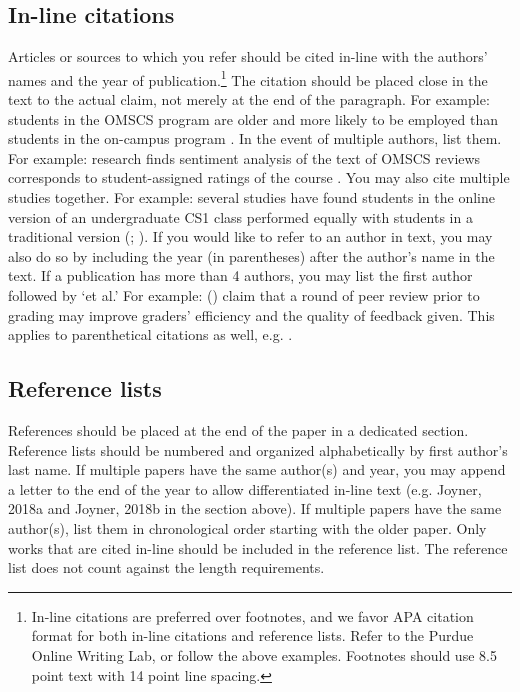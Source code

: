\documentclass[
	letterpaper, %
]{jdf}
\begin{document}
\subsection{In-line citations}
Articles or sources to which you refer should be cited in-line with the authors’ names and the year of publication.\footnote{In-line citations are preferred over footnotes, and we favor APA citation format for both in-line citations and reference lists. Refer to the Purdue Online Writing Lab, or follow the above examples. Footnotes should use 8.5 point text with 14 point line spacing.} The citation should be placed close in the text to the actual claim, not merely at the end of the paragraph. For example: students in the OMSCS program are older and more likely to be employed than students in the on-campus program \citep{joyner2017}. In the event of multiple authors, list them. For example: research finds sentiment analysis of the text of OMSCS reviews corresponds to student-assigned ratings of the course \citep{newman2018}. You may also cite multiple studies together. For example: several studies have found students in the online version of an undergraduate CS1 class performed equally with students in a traditional version (\cite{joyner2018a}; \cite{joyner2018b}). If you would like to refer to an author in text, you may also do so by including the year (in parentheses) after the author’s name in the text. If a publication has more than 4 authors, you may list the first author followed by ‘et al.’ For example: \citeauthor{joyner2016} (\citeyear{joyner2016}) claim that a round of peer review prior to grading may improve graders’ efficiency and the quality of feedback given. This applies to parenthetical citations as well, e.g. \citep{joyner2016}.

\subsection{Reference lists}
References should be placed at the end of the paper in a dedicated section. Reference lists should be numbered and organized alphabetically by first author’s last name. If multiple papers have the same author(s) and year, you may append a letter to the end of the year to allow differentiated in-line text (e.g. Joyner, 2018a and Joyner, 2018b in the section above). If multiple papers have the same author(s), list them in chronological order starting with the older paper. Only works that are cited in-line should be included in the reference list. The reference list does not count against the length requirements.
\end{document}
